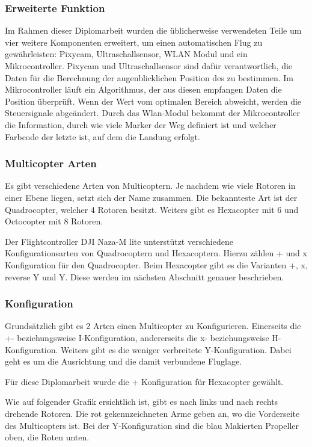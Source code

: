   \subsubsection{Erweiterte Funktion}
  Im Rahmen dieser Diplomarbeit wurden die üblicherweise verwendeten Teile um vier weitere Komponenten erweitert, um einen automatischen Flug zu gewährleisten: Pixycam, Ultraschallsensor, WLAN Modul und ein Mikrocontroller. Pixycam und Ultraschallsensor sind dafür verantwortlich, die Daten für die Berechnung der augenblicklichen Position des zu bestimmen. Im Mikrocontroller läuft ein Algorithmus, der aus diesen empfangen Daten die Position überprüft. Wenn der Wert vom optimalen Bereich abweicht, werden die Steuersignale abgeändert. Durch das Wlan-Modul bekommt der Mikrocontroller die Information, durch wie viele Marker der Weg definiert ist und welcher Farbcode der letzte ist, auf dem die Landung erfolgt.


  \subsubsection{Multicopter Arten}
  Es gibt verschiedene Arten von Multicoptern. 
  Je nachdem wie viele Rotoren in einer Ebene liegen, setzt sich der Name zusammen.
  Die bekannteste Art ist der Quadrocopter, welcher 4 Rotoren besitzt. Weiters gibt es Hexacopter mit 6 und Octocopter mit 8 Rotoren. \cite{GrundlagenMulticopter}

  Der Flightcontroller DJI Naza-M lite unterstützt verschiedene Konfigurationsarten von Quadrocoptern und Hexacoptern. Hierzu zählen + und x Konfiguration für den Quadrocopter. Beim Hexacopter gibt es die Varianten +, x, reverse Y und Y. Diese werden im nächsten Abschnitt genauer beschrieben. \cite{NAZA_Konfig}

  \subsubsection{Konfiguration}
  Grundsätzlich gibt es 2 Arten einen Multicopter zu Konfigurieren. \cite{GrundlagenMulticopter}
  Einerseits die +- beziehungsweise I-Konfiguration, andererseits die x- beziehungsweise H-Konfiguration. Weiters gibt es die weniger verbreitete Y-Konfiguration. Dabei geht es um die Ausrichtung und die damit verbundene Fluglage. 

  Für diese Diplomarbeit wurde die + Konfiguration für Hexacopter gewählt.

  Wie auf folgender Grafik ersichtlich ist, gibt es nach links und nach rechts drehende Rotoren. Die rot gekennzeichneten Arme geben an, wo die Vorderseite des Multicopters ist. Bei der Y-Konfiguration sind die blau Makierten Propeller oben, die Roten unten.

